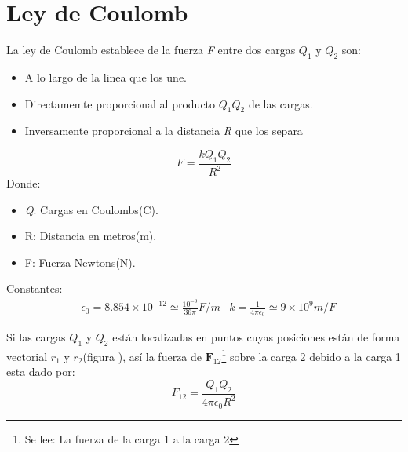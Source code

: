 \documentclass[11pt,fleqn,a4paper,]{LegrandOrangeBook}
\begin{document}
\section{Ley de Coulomb}
La ley de Coulomb establece de la fuerza \textit{F} entre dos cargas \textit{$Q_1$} y \textit{$Q_2$} son:
\begin{itemize}
\item A lo largo de la linea que los une.
\item Directamemte proporcional al producto \textit{$Q_1Q_2$} de las cargas.
\item Inversamente proporcional a la distancia \textit{R} que los separa
\end{itemize}
\begin{theorem}
\begin{equation}
\label{eq:eqCoulomb}
F=\frac{kQ_1Q_2}{R^2}
\end{equation}
Donde:\\
\begin{itemize}
\item \textit{Q}: Cargas en Coulombs(C).
\item R: Distancia en metros(m).
\item F: Fuerza Newtons(N).
\end{itemize}
Constantes:
\begin{align*}
&\epsilon_0=8.854 \times 10^{-12}\simeq \frac{10^{-9}}{36\pi}F/m
&k=\frac{1}{4\pi\epsilon_0}\simeq 9\times 10^9 m/F
\end{align*}
\end{theorem}
Si las cargas $\textit{Q}_1$ y $\textit{Q}_2$ están localizadas en puntos cuyas posiciones están de forma vectorial $\textit{r}_1$ y $\textit{r}_2$(figura ), así la fuerza de $\textbf{F}_{12}$\footnote{Se lee: La fuerza de la carga 1 a la carga 2} sobre la carga 2 debido a la carga 1 esta dado por:
\begin{equation}
\boxed{F_{12}=\frac{Q_1Q_2}{4\pi\epsilon_0R^2}}
\end{equation}
\end{document}
